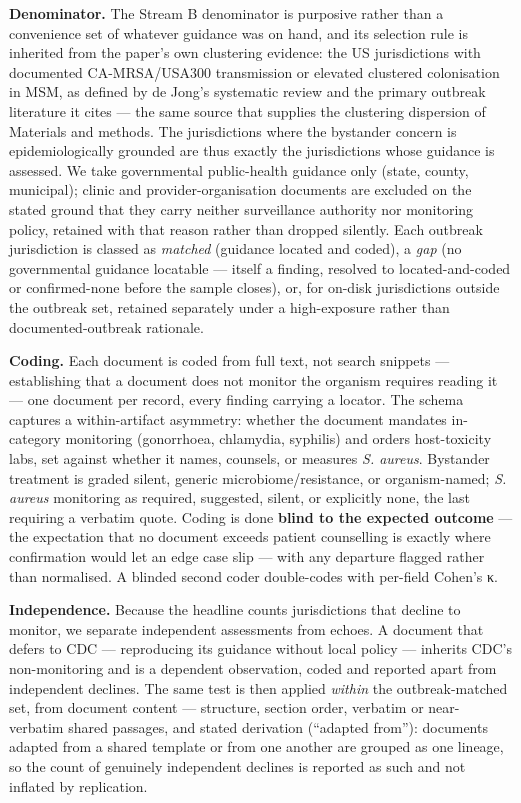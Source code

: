 \documentclass[10pt,letterpaper]{article}
\begin{document}
\textbf{Denominator.} The Stream B denominator is purposive rather than
a convenience set of whatever guidance was on hand, and its selection
rule is inherited from the paper's own clustering evidence: the US
jurisdictions with documented CA-MRSA/USA300 transmission or elevated
clustered colonisation in MSM, as defined by de Jong's systematic review
and the primary outbreak literature it cites
\cite{dejong2025, diep2008} --- the same source that supplies the
clustering dispersion of Materials and methods. The jurisdictions where
the bystander concern is epidemiologically grounded are thus exactly the
jurisdictions whose guidance is assessed. We take governmental
public-health guidance only (state, county, municipal); clinic and
provider-organisation documents are excluded on the stated ground that
they carry neither surveillance authority nor monitoring policy,
retained with that reason rather than dropped silently. Each outbreak
jurisdiction is classed as \emph{matched} (guidance located and coded),
a \emph{gap} (no governmental guidance locatable --- itself a finding,
resolved to located-and-coded or confirmed-none before the sample
closes), or, for on-disk jurisdictions outside the outbreak set,
retained separately under a high-exposure rather than
documented-outbreak rationale.

\textbf{Coding.} Each document is coded from full text, not search
snippets --- establishing that a document does not monitor the organism
requires reading it --- one document per record, every finding carrying
a locator. The schema captures a within-artifact asymmetry: whether the
document mandates in-category monitoring (gonorrhoea, chlamydia,
syphilis) and orders host-toxicity labs, set against whether it names,
counsels, or measures \emph{S. aureus}. Bystander treatment is graded
silent, generic microbiome/resistance, or organism-named; \emph{S.
aureus} monitoring as required, suggested, silent, or explicitly none,
the last requiring a verbatim quote. Coding is done \textbf{blind to the
expected outcome} --- the expectation that no document exceeds patient
counselling is exactly where confirmation would let an edge case slip
--- with any departure flagged rather than normalised. A blinded second
coder double-codes with per-field Cohen's κ.

\textbf{Independence.} Because the headline counts jurisdictions that
decline to monitor, we separate independent assessments from echoes. A
document that defers to CDC --- reproducing its guidance without local
policy --- inherits CDC's non-monitoring and is a dependent observation,
coded and reported apart from independent declines. The same test is
then applied \emph{within} the outbreak-matched set, from document
content --- structure, section order, verbatim or near-verbatim shared
passages, and stated derivation (``adapted from''): documents adapted
from a shared template or from one another are grouped as one lineage,
so the count of genuinely independent declines is reported as such and
not inflated by replication.
\end{document}
